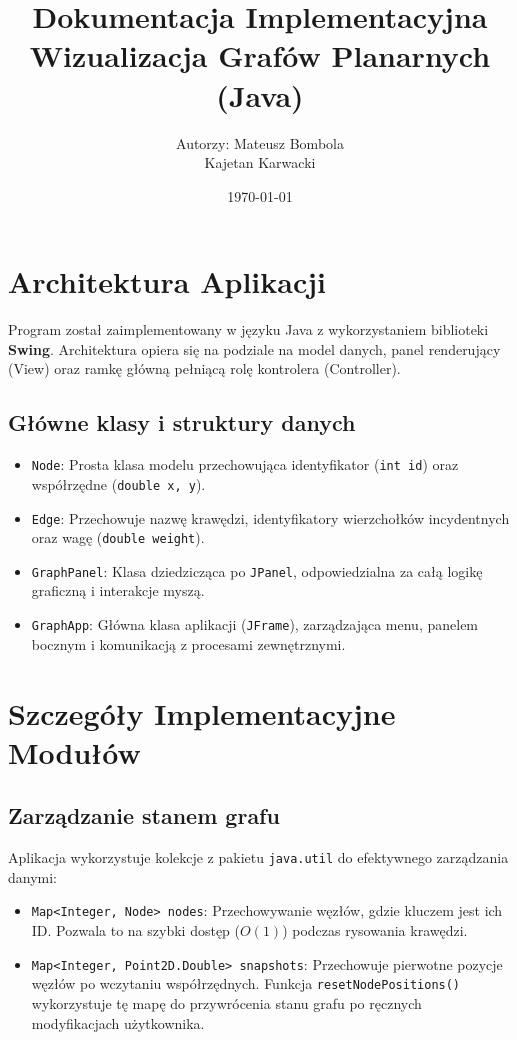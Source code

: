 \documentclass[12pt, a4paper]{article}
\title{\vspace*{3cm} \textbf{Dokumentacja Implementacyjna}\\Wizualizacja Grafów Planarnych (Java)}}
\author{Autorzy: Mateusz Bombola \\ Kajetan Karwacki}
\date{\today}
\begin{document}
\maketitle
\thispagestyle{empty}

\newpage
\tableofcontents
\newpage

\section{Architektura Aplikacji}
Program został zaimplementowany w języku Java z wykorzystaniem biblioteki \textbf{Swing}. Architektura opiera się na podziale na model danych, panel renderujący (View) oraz ramkę główną pełniącą rolę kontrolera (Controller).

\subsection{Główne klasy i struktury danych}
\begin{itemize}
    \item \texttt{Node}: Prosta klasa modelu przechowująca identyfikator (\texttt{int id}) oraz współrzędne (\texttt{double x, y}).
    \item \texttt{Edge}: Przechowuje nazwę krawędzi, identyfikatory wierzchołków incydentnych oraz wagę (\texttt{double weight}).
    \item \texttt{GraphPanel}: Klasa dziedzicząca po \texttt{JPanel}, odpowiedzialna za całą logikę graficzną i interakcje myszą.
    \item \texttt{GraphApp}: Główna klasa aplikacji (\texttt{JFrame}), zarządzająca menu, panelem bocznym i komunikacją z procesami zewnętrznymi.
\end{itemize}

\section{Szczegóły Implementacyjne Modułów}

\subsection{Zarządzanie stanem grafu}
Aplikacja wykorzystuje kolekcje z pakietu \texttt{java.util} do efektywnego zarządzania danymi:
\begin{itemize}
    \item \texttt{Map<Integer, Node> nodes}: Przechowywanie węzłów, gdzie kluczem jest ich ID. Pozwala to na szybki dostęp ($O(1)$) podczas rysowania krawędzi.
    \item \texttt{Map<Integer, Point2D.Double> snapshots}: Przechowuje pierwotne pozycje węzłów po wczytaniu współrzędnych. Funkcja \texttt{resetNodePositions()} wykorzystuje tę mapę do przywrócenia stanu grafu po ręcznych modyfikacjach użytkownika.
\end{itemize}
\end{document}
